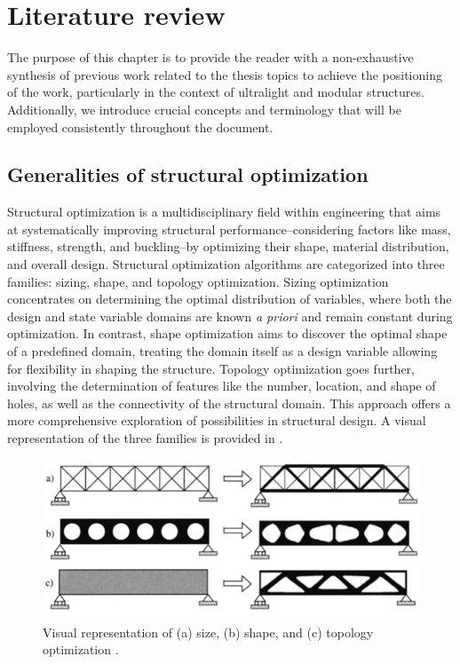 \setchapterpreamble[u]{\margintoc}
\glsresetall %

\chapter{Literature review} \label{chap:02}
The purpose of this chapter is to provide the reader with a non-exhaustive synthesis of previous work related to the thesis topics to achieve the positioning of the work, particularly in the context of ultralight and modular structures. Additionally, we introduce crucial concepts and terminology that will be employed consistently throughout the document.

\section{Generalities of structural optimization}
Structural optimization is a multidisciplinary field within engineering that aims at systematically improving structural performance--considering factors like mass, stiffness, strength, and buckling--by optimizing their shape, material distribution, and overall design. Structural optimization algorithms are categorized into three families: sizing, shape, and topology optimization. Sizing optimization concentrates on determining the optimal distribution of variables, where both the design and state variable domains are known \textit{a priori} and remain constant during optimization. In contrast, shape optimization aims to discover the optimal shape of a predefined domain, treating the domain itself as a design variable allowing for flexibility in shaping the structure. Topology optimization goes further, involving the determination of features like the number, location, and shape of holes, as well as the connectivity of the structural domain. This approach offers a more comprehensive exploration of possibilities in structural design. A visual representation of the three families is provided in .

\begin{figure}
    \centering
    \includegraphics[width=\linewidth]{figures/02_literature/opt_family.png}
    \caption{Visual representation of (a) size, (b) shape, and (c) topology optimization \cite{bendsoe_topology_2004}.}
    \label{fig:02_opt_fam}
\end{figure}


